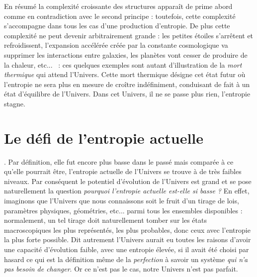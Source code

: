 En résumé la complexité croissante des structures apparaît de prime abord comme en contradiction avec le second principe : toutefois, cette complexité s'accompagne dans tous les cas d'une production d'entropie. De plus cette complexité ne peut devenir arbitrairement grande : les petites étoiles s'arrêtent et refroidissent, l'expansion accélérée créée par la constante cosmologique va supprimer les interactions entre galaxies, les planètes vont cesser de produire de la chaleur, etc... ~: ces quelques exemples sont autant d'illustration de la \textit{mort thermique} qui attend l'Univers. Cette mort thermique désigne cet état futur où l'entropie ne sera plus en mesure de croître indéfiniment, conduisant de fait à un état d'équilibre de l'Univers. Dans cet Univers, il ne se passe plus rien, l'entropie stagne.

\section{Le défi de l'entropie actuelle}

. Par définition, elle fut encore plus basse dans le passé mais comparée à ce qu'elle pourrait être, l'entropie actuelle de l'Univers se trouve à de très faibles niveaux. Par conséquent le potentiel d'évolution de l'Univers est grand et se pose naturellement la question \textit{pourquoi l'entropie actuelle est-elle si basse ?} En effet, imaginons que l'Univers que nous connaissons soit le fruit d'un tirage de lois, paramètres physiques, géométries, etc... parmi tous les ensembles disponibles : normalement, un tel tirage doit naturellement tomber sur les états macroscopiques les plus représentés, les plus probables, donc ceux avec l'entropie la plus forte possible. Dit autrement l'Univers aurait eu toutes les raisons d'avoir une capacité d'évolution faible, avec une entropie élevée, si il avait été choisi par hasard ce qui est la définition même de la \textit{perfection} à savoir un système \textit{qui n'a pas besoin de changer}. Or ce n'est pas le cas, notre Univers n'est pas parfait.


